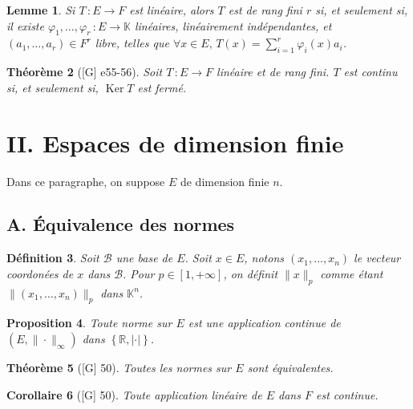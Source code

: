 \documentclass[10pt, a4paper, parskip=full, twoside, twocolumn]{report}
\newtheorem{definition}{Définition}
\newtheorem{theorem}[definition]{Théorème}
\newtheorem{proposition}[definition]{Proposition}
\newtheorem{lemma}[definition]{Lemme}
\newtheorem{corollary}[definition]{Corollaire}
\newcommand{\IK}{\mathbb{K}}
\newcommand{\IR}{\mathbb{R}}
\newcommand{\B}{\mathcal{B}}
\DeclareMathOperator{\Ker}{Ker}
\begin{document}
\begin{lemma}
	Si $T\,\colon E\to F$ est linéaire, alors $T$ est de rang fini $r$ si, et seulement si, il existe $\varphi_1,\dots,\varphi_r\,\colon E\to \IK$ linéaires, linéairement indépendantes, et $(a_1,\dots,a_r)\in F^r$ libre, telles que $\forall x\in E,\, T(x) = \sum_{i=1}^{r}\varphi_i(x) a_i$.
\end{lemma}

\begin{theorem}[\textnormal{[G] e55-56}]
	Soit $T\,\colon E\to F$ linéaire et de rang fini.
	$T$ est continu si, et seulement si, $\Ker T$ est fermé.
\end{theorem}

\section*{II. Espaces de dimension finie}
\textcolor{paragraphtext}{Dans ce paragraphe, on suppose $E$ de dimension finie $n$.}
\subsection*{A. Équivalence des normes}
\begin{definition}
	Soit $\B$ une base de $E$. Soit $x\in E$, notons $(x_1,\dots, x_n)$ le vecteur coordonées de $x$ dans $\B$. Pour $p\in[1,+\infty]$, on définit $\|x\|_p$ comme étant $\|(x_1,\dots, x_n)\|_p$ dans $\IK^n$.
\end{definition}

\begin{proposition}
	Toute norme sur $E$ est une application continue de $\left(E,\|\cdot\|_{\infty}\right)$ dans $\left\{\IR, \vert\cdot\vert\right\}$.
\end{proposition}

\begin{tcolorbox}[
    breakable, %
    colback=developpement, %
    colframe=gray!0!black, %
    boxrule=0pt, %
    arc=1mm, %
	boxsep=0pt,
	left=0pt, right=0pt, top=0pt, bottom=0pt
]
\begin{theorem}[\textnormal{[G] 50}]
	\label{208dev11}
	Toutes les normes sur $E$ sont équivalentes.
\end{theorem}
\end{tcolorbox}

\begin{corollary}[\textnormal{[G] 50}]
	Toute application linéaire de $E$ dans $F$ est continue.
\end{corollary}
\end{document}
